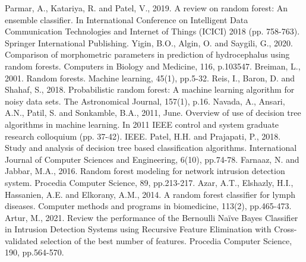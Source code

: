 \documentclass[conference]{IEEEtran}
\begin{document}
\begin{thebibliography}{00}
Parmar, A., Katariya, R. and Patel, V., 2019. A review on random forest: An ensemble classifier. In International Conference on Intelligent Data Communication Technologies and Internet of Things (ICICI) 2018 (pp. 758-763). Springer International Publishing.
Yigin, B.O., Algin, O. and Saygili, G., 2020. Comparison of morphometric parameters in prediction of hydrocephalus using random forests. Computers in Biology and Medicine, 116, p.103547.
Breiman, L., 2001. Random forests. Machine learning, 45(1), pp.5-32.
Reis, I., Baron, D. and Shahaf, S., 2018. Probabilistic random forest: A machine learning algorithm for noisy data sets. The Astronomical Journal, 157(1), p.16.
Navada, A., Ansari, A.N., Patil, S. and Sonkamble, B.A., 2011, June. Overview of use of decision tree algorithms in machine learning. In 2011 IEEE control and system graduate research colloquium (pp. 37-42). IEEE.
Patel, H.H. and Prajapati, P., 2018. Study and analysis of decision tree based classification algorithms. International Journal of Computer Sciences and Engineering, 6(10), pp.74-78.
Farnaaz, N. and Jabbar, M.A., 2016. Random forest modeling for network intrusion detection system. Procedia Computer Science, 89, pp.213-217.
Azar, A.T., Elshazly, H.I., Hassanien, A.E. and Elkorany, A.M., 2014. A random forest classifier for lymph diseases. Computer methods and programs in biomedicine, 113(2), pp.465-473.
Artur, M., 2021. Review the performance of the Bernoulli Naïve Bayes Classifier in Intrusion Detection Systems using Recursive Feature Elimination with Cross-validated selection of the best number of features. Procedia Computer Science, 190, pp.564-570.
\end{thebibliography}
\end{document}

